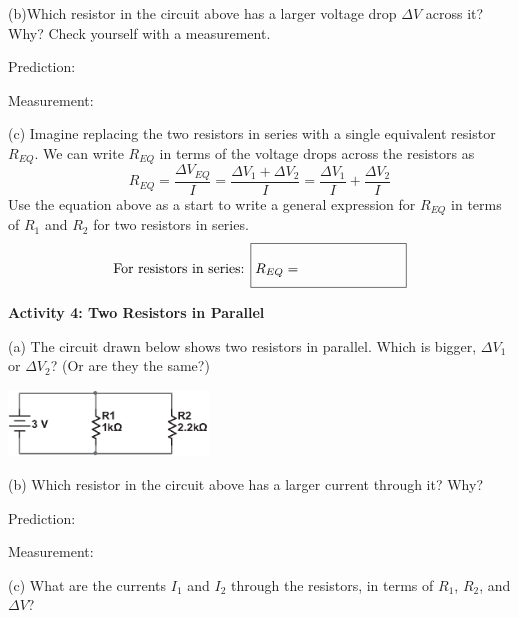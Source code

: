 (b)Which resistor in the circuit above has a larger voltage drop $\Delta V$ across it?   Why?  Check yourself with a measurement.  

\vspace{0.2 in}
\hspace{0.4 in} Prediction:
\vspace{0.2 in}

\hspace{0.4 in} Measurement:  
\vspace{0.2 in}

(c) Imagine replacing the two resistors in series with a single equivalent resistor $R_{EQ}$.  We can write $R_{EQ}$ in terms of the voltage drops across the resistors as
\begin{displaymath}
R_{EQ} = \frac{\Delta V_{EQ}}{I}= \frac{\Delta V_1 +\Delta V_2 }{I}=\frac{\Delta V_1}{I} + \frac{\Delta V_2}{I}
\end{displaymath}
Use the equation above as a start to write a general expression for $R_{EQ}$ in terms of $R_1$ and $R_2$ for two resistors in series.
\begin{displaymath}
\textrm{For resistors in series: } \boxed{R_{EQ} = \phantom{\rule[-0.1in]{1.0in}{.35in}}}
\end{displaymath}

\textbf{Activity 4: Two Resistors in Parallel} \par
\nopagebreak
(a)  The circuit drawn below shows two resistors in parallel.  Which is bigger, $\Delta V_1$ or $\Delta V_2$? (Or are they the same?)

\hspace{0.5 in}\includegraphics[width=0.4\textwidth]{electric_circuits2/circ_diag5_bw.eps}
\vspace{0.2 in}

\pagebreak
(b) Which resistor in the circuit above has a larger current through it?   Why? 
 
\vspace{0.2 in}
\hspace{0.4 in} Prediction:
\answerspace{0.2 in}

\hspace{0.4 in} Measurement:  
\answerspace{0.2 in}

(c) What are the currents $I_1$ and $I_2$ through the resistors, in terms of $R_1$, $R_2$, and  $\Delta V$? 
\answerspace{0.6in}

